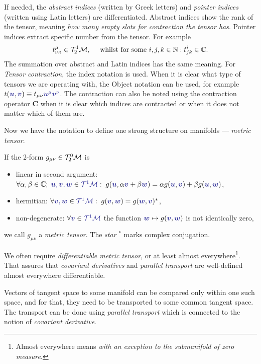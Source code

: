 If needed, the \emph{abstract indices} (written by Greek letters) and \emph{pointer indices} (written using Latin letters) are differentiated. Abstract indices show the rank of the tensor, meaning \emph{how many empty slots for contraction the tensor has}. Pointer indices extract specific number from the tensor. For example
$$t^\mu_{\nu\kappa} \in \mathcal{T}^1_2\mathcal{M}, \quad \text{ whilst for some }i,j,k\in\mathbb{N}: t^i_{jk}\in \mathbb C.$$
The summation over abstract and Latin indices has the same meaning. For \emph{Tensor contraction}, the index notation is used. When it is clear what type of tensors we are operating with, the Object notation can be used, for example $t(\bluee{\bm u},\bluee{\bm v})\equiv t_{\mu\nu}\bluee{\bm u^\mu \bm v^\nu}$. The contraction can also be noted using the contraction operator $\mathbf C$ when it is clear which indices are contracted or when it does not matter which of them are.

Now we have the notation to define one strong structure on manifolds — \emph{metric tensor}. 
\begin{definition}
If the 2-form $g_{\mu\nu}\in\mathcal{T}^0_2\mathcal{M}$ is
\begin{itemize}
    \item linear in second argument: $\forall \alpha,\beta\in\C;\; \bluee{\bm u,\bm v,\bm w}\in \bluee{\TT^1\M}: \; g(\bluee{\bm u},\alpha\bluee{\bm v}+\beta \bluee{\bm w}) = \alpha g(\bluee{\bm u},\bluee{\bm v})+\beta g(\bluee{\bm u},\bluee{\bm w})$,
    \item hermitian: $\forall \bluee{\bm v,\bm w}\in \bluee{\TT^1\M}: \; g(\bluee{\bm v},\bluee{\bm w})=g(\bluee{\bm w},\bluee{\bm v})^*$,
    \item non-degenerate: $\forall \bluee{\bm v}\in\bluee{\TT^1\M}$ the function $\bluee{\bm w}\mapsto g(\bluee{\bm v},\bluee{\bm w})$ is not identically zero,
\end{itemize} 
we call $g_{\mu\nu}$ a \emph{metric tensor}. The \emph{star} $^*$ marks complex conjugation.
\end{definition}

We often require \emph{differentiable metric tensor}, or at least almost everywhere\footnote{Almost everywhere means \emph{with an exception to the submanifold of zero measure}.}. That assures that \emph{covariant derivatives} and \emph{parallel transport} are well-defined almost everywhere differentiable. 




Vectors of tangent space to some manifold can be compared only within one such space, and for that, they need to be transported to some common tangent space. The transport can be done using \emph{parallel transport} which is connected to the notion of \emph{covariant derivative}.

